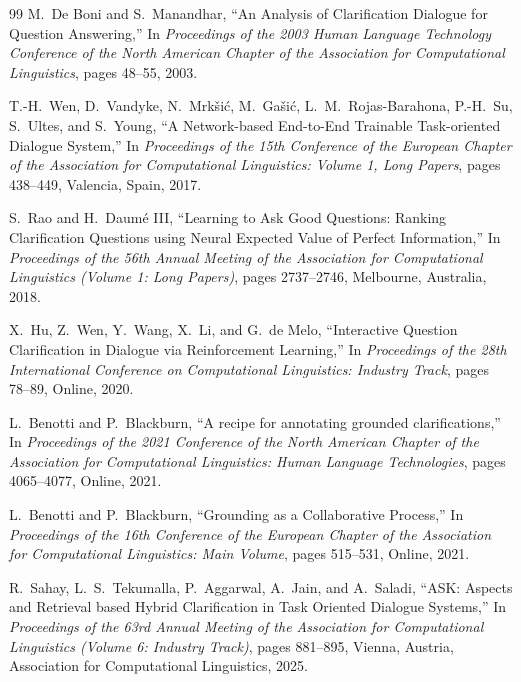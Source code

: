 \documentclass[11pt]{article}
\begin{document}
\begin{thebibliography}{99}
M.~De Boni and S.~Manandhar,
\newblock ``An Analysis of Clarification Dialogue for Question Answering,''
\newblock In \emph{Proceedings of the 2003 Human Language Technology Conference of the North American Chapter of the Association for Computational Linguistics}, pages 48--55, 2003.

T.-H.~Wen, D.~Vandyke, N.~Mrk{\v{s}}i{\'c}, M.~Ga{\v{s}}i{\'c}, L.~M.~Rojas-Barahona, P.-H.~Su, S.~Ultes, and S.~Young,
\newblock ``A Network-based End-to-End Trainable Task-oriented Dialogue System,''
\newblock In \emph{Proceedings of the 15th Conference of the European Chapter of the Association for Computational Linguistics: Volume 1, Long Papers}, pages 438--449, Valencia, Spain, 2017.

S.~Rao and H.~Daum{\'e} III,
\newblock ``Learning to Ask Good Questions: Ranking Clarification Questions using Neural Expected Value of Perfect Information,''
\newblock In \emph{Proceedings of the 56th Annual Meeting of the Association for Computational Linguistics (Volume 1: Long Papers)}, pages 2737--2746, Melbourne, Australia, 2018.

X.~Hu, Z.~Wen, Y.~Wang, X.~Li, and G.~de Melo,
\newblock ``Interactive Question Clarification in Dialogue via Reinforcement Learning,''
\newblock In \emph{Proceedings of the 28th International Conference on Computational Linguistics: Industry Track}, pages 78--89, Online, 2020.

L.~Benotti and P.~Blackburn,
\newblock ``A recipe for annotating grounded clarifications,''
\newblock In \emph{Proceedings of the 2021 Conference of the North American Chapter of the Association for Computational Linguistics: Human Language Technologies}, pages 4065--4077, Online, 2021.

L.~Benotti and P.~Blackburn,
\newblock ``Grounding as a Collaborative Process,''
\newblock In \emph{Proceedings of the 16th Conference of the European Chapter of the Association for Computational Linguistics: Main Volume}, pages 515--531, Online, 2021.

R.~Sahay, L.~S.~Tekumalla, P.~Aggarwal, A.~Jain, and A.~Saladi,
\newblock ``ASK: Aspects and Retrieval based Hybrid Clarification in Task Oriented Dialogue Systems,''
\newblock In \emph{Proceedings of the 63rd Annual Meeting of the Association for Computational Linguistics (Volume 6: Industry Track)}, pages 881--895, Vienna, Austria, Association for Computational Linguistics, 2025.


\end{thebibliography}
\end{document}
